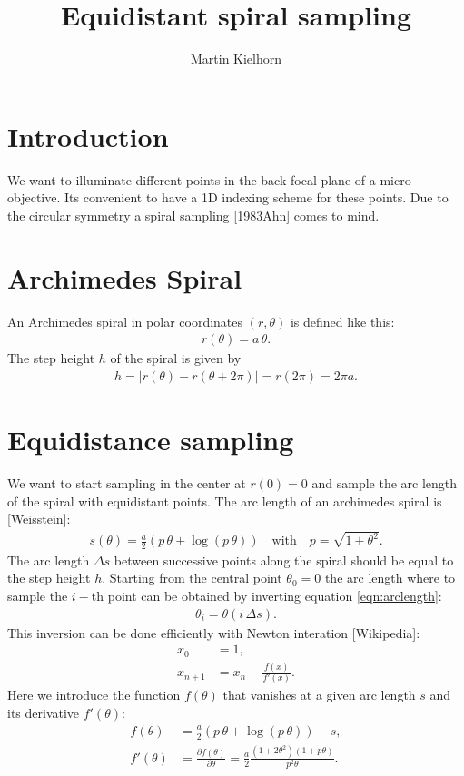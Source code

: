 \documentclass[twocolumn,DIV18]{scrartcl}
\newcommand{\abs}[1]{\lvert #1 \rvert}
\renewcommand{\(}{\left(}
\renewcommand{\)}{\right)}
\begin{document}
\title{Equidistant spiral sampling}
\author{Martin Kielhorn}
\maketitle
\section{Introduction}
We want to illuminate different points in the back focal plane of a
micro objective. Its convenient to have a 1D indexing scheme for these
points. Due to the circular symmetry a spiral sampling [1983Ahn] comes
to mind. 

\section{Archimedes Spiral}
An Archimedes spiral in polar coordinates $(r,\theta)$ is defined like
this:
\begin{align} \label{eqn:def}
  r(\theta)=a\,\theta.
\end{align}
The step height $h$ of the spiral is given by
\begin{align}
  h=\abs{r(\theta)-r(\theta+2\pi)}=r(2\pi)=2\pi a.
\end{align}
\section{Equidistance sampling}
We want to start sampling in the center at $r(0)=0$ and sample the arc
length of the spiral with equidistant points. The arc length of an
archimedes spiral is [Weisstein]:
\begin{align} \label{eqn:arclength}
  s(\theta)=\frac{a}{2}\(p\,\theta + \log(p\,\theta)\)\quad\textrm{with}\quad
  p=\sqrt{1+\theta^2}.
\end{align}
The arc length $\Delta s$ between successive points along the spiral
should be equal to the step height $h$. Starting from the central
point $\theta_0=0$ the arc length where to sample the $i-$th point can
be obtained by inverting equation \eqref{eqn:arclength}:
\begin{align}
  \theta_i=\theta(i\,\Delta s).
\end{align}
This inversion can be done efficiently with Newton interation
[Wikipedia]:
\begin{align}
  x_0&=1,\\
  x_{n+1}&=x_n-\frac{f(x)}{f'(x)}.
\end{align}
Here we introduce the function $f(\theta)$ that vanishes at a given arc
length $s$ and its derivative $f'(\theta)$:
\begin{align}
  \label{eqn:f}
  f(\theta)&=\frac{a}{2}\(p\,\theta+\log(p\,\theta)\)-s,\\
  f'(\theta)&=\frac{\partial f(\theta)}{\partial \theta}=
  \frac{a}{2}\frac{(1+2\theta^2)(1+p\theta)}{p^2 \theta}.
\end{align}
\end{document}
